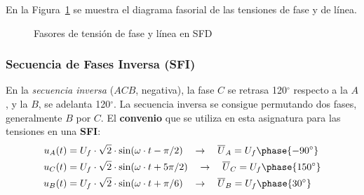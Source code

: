 	En la Figura~\ref{fig:linea-fase-SFD} se muestra el diagrama fasorial de las tensiones de fase y de línea. 
	\begin{figure}[H]
		\centering
		\hfil
		\caption{Fasores de tensión de fase y línea en SFD}
		\label{fig:linea-fase-SFD}
	\end{figure}
	
	\subsubsection{Secuencia de Fases Inversa (SFI)}
	
	En la \textit{secuencia inversa} ($ACB$, negativa), la fase $C$ se retrasa 120$^\circ$ respecto a la $A$, y la $B$, se adelanta 120$^\circ$. La secuencia inversa se consigue permutando dos fases, generalmente $B$ por $C$. El \textbf{convenio} que se utiliza en esta asignatura para las tensiones en una \textbf{SFI}:
	\begin{align*}
		u_{A}(t)&=U_f\cdot\sqrt{2}\cdot \sin(\omega\cdot t -\pi/2) \quad\rightarrow\quad \overline{U}_{A}=U_f\phase {-90^\circ}\\
		u_{C}(t)&=U_f\cdot\sqrt{2}\cdot \sin(\omega\cdot t +5\pi/2) \quad\rightarrow\quad \overline{U}_{C}=U_f\phase {150^\circ}\\
		u_{B}(t)&=U_f\cdot\sqrt{2}\cdot \sin(\omega\cdot t +\pi/6) \quad\rightarrow\quad \overline{U}_{B}=U_f\phase {30^\circ}
	\end{align*}
	
